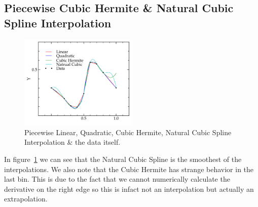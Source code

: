 \documentclass[11pt,letterpaper]{article}
\begin{document}
\subsection{Piecewise Cubic Hermite \& Natural Cubic Spline Interpolation}

\begin{figure}[bth]
\centering
\includegraphics[width=0.5\textwidth]{herm_natural_cubic.pdf}
\caption{Piecewise Linear, Quadratic, Cubic Hermite, Natural Cubic Spline
Interpolation \& the data itself.}
\label{fig:herm_natural}
\end{figure}

In figure~\ref{fig:herm_natural} we can see that the Natural Cubic Spline
is the smoothest of the interpolations. We also note that the Cubic Hermite 
has strange behavior in the last bin. This is due to the fact that we cannot 
numerically calculate the derivative on the right edge so this is infact not
an interpolation but actually an extrapolation.
\end{document}
